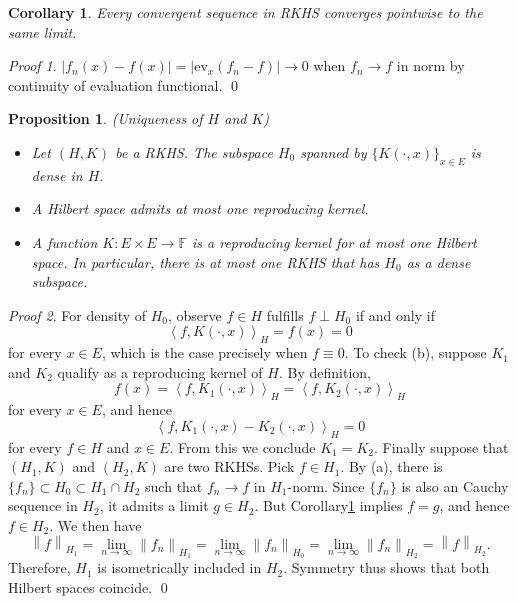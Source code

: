 \documentclass[a4paper,12pt]{article}
\newtheorem{prp}[thm]{Proposition}
\newtheorem{cor}[thm]{Corollary}
\theoremstyle{remark}
\newtheorem*{prf}{Proof}
\theoremstyle{definition}
\theoremstyle{definition}
\theoremstyle{definition}
\newcommand{\ip}[2]{\left<#1, #2 \right>}
\newcommand{\abs}[1]{\left| #1 \right|}
\newcommand{\norm}[1]{\left\| #1 \right\|}
\newcommand{\ev}[1]{\mathrm{ev}_{#1}}
\begin{document}
\begin{cor}\label{norm convergence implies pointwiese convergence}
	Every convergent sequence in RKHS converges pointwise to the same limit.
\end{cor}
\begin{prf}
	\( \abs{ f_n(x) - f(x)} = \abs{\ev{x}(f_n - f)} \to 0 \) when \( f_n \to f \) in norm by continuity of evaluation functional.
	\qed\end{prf}

\begin{prp}(Uniqueness of \( H \) and \( K \))\label{Density and Unique of RKHS}

	\begin{itemize}
		\item[(a)] Let \( (H,K) \) be a RKHS. The subspace \( H_0 \) spanned by \( \{K(\cdot ,x) \} _{x \in E} \) is dense in \( H \).
		\item[(b)] A Hilbert space admits at most one reproducing kernel.
		\item[(c)] A function \( K:E \times E \to \mathbb{F} \) is a reproducing kernel for at most one Hilbert space. In particular, there is at most one RKHS that has \( H_0 \) as a dense subspace.
	\end{itemize}
\end{prp}
\begin{prf}
	For density of \( H_0 \), observe \( f \in H \) fulfills \( f \perp H_0 \) if and only if
	\begin{equation*}
		\ip{f}{K(\cdot ,x)}_H = f(x)=0
	\end{equation*}
	for every \( x \in E \), which is the case precisely when \( f \equiv 0 \).
	To check (b), suppose \( K_1 \) and \( K_2 \) qualify as a reproducing kernel of \( H \). By definition,
	\begin{equation*}
		f(x) = \ip{f}{K_1(\cdot ,x)}_H =\ip{f}{K_2(\cdot ,x)}_H
	\end{equation*}
	for every \( x \in E \), and hence
	\begin{equation*}
		\ip{f}{K_1(\cdot ,x)- K_2(\cdot ,x)}_H = 0
	\end{equation*}
	for every \( f \in H \) and \( x \in E \). From this we conclude \( K_1 =K_2 \).
	Finally suppose that \( (H_1,K) \) and \( (H_2,K) \) are two RKHSs.
	Pick \( f \in H_1 \). By (a), there is \( \{f_n\} \subset H_0 \subset H_1 \cap H_2 \) such that \( f_n \to f \) in \( H_1 \)-norm. Since \( \{f_n\} \) is also an Cauchy sequence in \( H_2 \), it admits a limit \( g \in H_2 \). But Corollary\ref{norm convergence implies pointwiese convergence} implies \( f=g \), and hence \( f \in H_2 \). We then have
	\begin{equation*}
		\norm{f}_{H_1}
		= \lim_{n \to \infty} \norm{f_n}_{H_1}
		=\lim_{n \to \infty} \norm{f_n}_{H_0}
		=\lim_{n \to \infty} \norm{f_n}_{H_2}
		=\norm{f}_{H_2}.
	\end{equation*}
	Therefore, \( H_1 \) is isometrically included in \( H_2 \). Symmetry thus shows that both Hilbert spaces coincide.
	\qed\end{prf}
\end{document}
